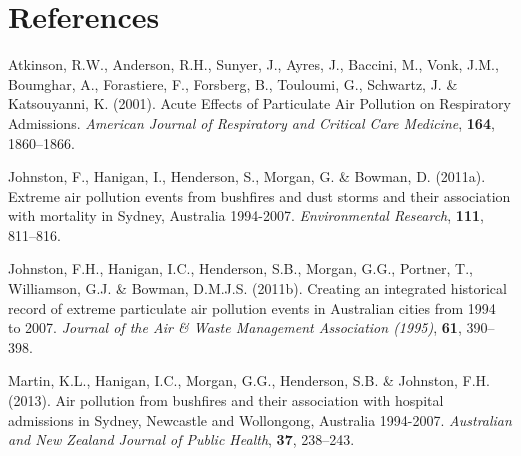 \section{References}

Atkinson, R.W., Anderson, R.H., Sunyer, J., Ayres, J., Baccini, M.,
Vonk, J.M., Boumghar, A., Forastiere, F., Forsberg, B., Touloumi, G.,
Schwartz, J. \& Katsouyanni, K. (2001). Acute Effects of Particulate Air
Pollution on Respiratory Admissions. \emph{American Journal of
Respiratory and Critical Care Medicine}, \textbf{164}, 1860--1866.

Johnston, F., Hanigan, I., Henderson, S., Morgan, G. \& Bowman, D.
(2011a). Extreme air pollution events from bushfires and dust storms and
their association with mortality in Sydney, Australia 1994-2007.
\emph{Environmental Research}, \textbf{111}, 811--816.

Johnston, F.H., Hanigan, I.C., Henderson, S.B., Morgan, G.G., Portner,
T., Williamson, G.J. \& Bowman, D.M.J.S. (2011b). Creating an integrated
historical record of extreme particulate air pollution events in
Australian cities from 1994 to 2007. \emph{Journal of the Air \& Waste
Management Association (1995)}, \textbf{61}, 390--398.

Martin, K.L., Hanigan, I.C., Morgan, G.G., Henderson, S.B. \& Johnston,
F.H. (2013). Air pollution from bushfires and their association with
hospital admissions in Sydney, Newcastle and Wollongong, Australia
1994-2007. \emph{Australian and New Zealand Journal of Public Health},
\textbf{37}, 238--243.

